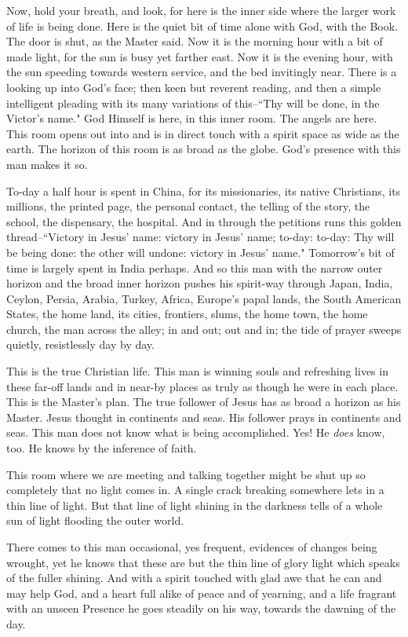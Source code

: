 Now, hold your breath, and look, for here is the inner side where the
larger work of life is being done. Here is the quiet bit of time alone
with God, with the Book. The door is shut, as the Master said. Now it is
the morning hour with a bit of made light, for the sun is busy yet farther
east. Now it is the evening hour, with the sun speeding towards western
service, and the bed invitingly near. There is a looking up into God's
face; then keen but reverent reading, and then a simple intelligent
pleading with its many variations of this--``Thy will be done, in the
Victor's name." God Himself is here, in this inner room. The angels are
here. This room opens out into and is in direct touch with a spirit space
as wide as the earth. The horizon of this room is as broad as the globe.
God's presence with this man makes it so.

To-day a half hour is spent in China, for its missionaries, its native
Christians, its millions, the printed page, the personal contact, the
telling of the story, the school, the dispensary, the hospital. And in
through the petitions runs this golden thread--``Victory in Jesus' name:
victory in Jesus' name; to-day: to-day: Thy will be being done: the other
will undone: victory in Jesus' name." Tomorrow's bit of time is largely
spent in India perhaps. And so this man with the narrow outer horizon and
the broad inner horizon pushes his spirit-way through Japan, India,
Ceylon, Persia, Arabia, Turkey, Africa, Europe's papal lands, the South
American States, the home land, its cities, frontiers, slums, the home
town, the home church, the man across the alley; in and out; out and in;
the tide of prayer sweeps quietly, resistlessly day by day.

This is the true Christian life. This man is winning souls and refreshing
lives in these far-off lands and in near-by places as truly as though he
were in each place. This is the Master's plan. The true follower of Jesus
has as broad a horizon as his Master. Jesus thought in continents and
seas. His follower prays in continents and seas. This man does not know
what is being accomplished. Yes! He \textit{does} know, too. He knows by the
inference of faith.

This room where we are meeting and talking together might be shut up so
completely that no light comes in. A single crack breaking somewhere lets
in a thin line of light. But that line of light shining in the darkness
tells of a whole sun of light flooding the outer world.

There comes to this man occasional, yes frequent, evidences of changes
being wrought, yet he knows that these are but the thin line of glory
light which speaks of the fuller shining. And with a spirit touched with
glad awe that he can and may help God, and a heart full alike of peace and
of yearning, and a life fragrant with an unseen Presence he goes steadily
on his way, towards the dawning of the day.




